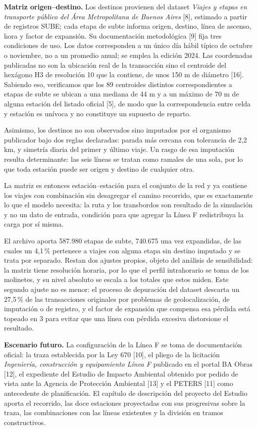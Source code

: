\documentclass{article}
\begin{document}
\textbf{Matriz origen--destino.} Los destinos provienen del dataset \textit{Viajes y etapas en transporte
público del Área Metropolitana de Buenos Aires} [8], estimado a partir de registros SUBE; cada etapa de
subte informa origen, destino, línea de ascenso, hora y factor de expansión. Su documentación metodológica
[9] fija tres condiciones de uso. Los datos corresponden a un único día hábil típico de octubre o noviembre,
no a un promedio anual; se emplea la edición 2024. Las coordenadas publicadas no son la ubicación real de la
transacción sino el centroide del hexágono H3 de resolución 10 que la contiene, de unos 150 m de diámetro [16]. Sabiendo eso, verificamos que los 89 centroides distintos correspondientes a etapas de subte se ubican a una mediana de
44 m y a un máximo de 70 m de alguna estación del listado oficial [5], de modo que la correspondencia entre
celda y estación es unívoca y no constituye un supuesto de reparto. 

Asimismo, los destinos no son observados sino
imputados por el organismo publicador bajo dos reglas declaradas: parada más cercana con tolerancia de
2,2 km, y simetría diaria del primer y último viaje. Un rasgo de esa imputación resulta determinante: las seis líneas se tratan como ramales de una sola, por lo
que toda estación puede ser origen y destino de cualquier otra. 

La matriz es entonces estación--estación para el
conjunto de la red y ya contiene los viajes con combinación sin desagregar el camino recorrido, que es
exactamente lo que el modelo necesita: la ruta y los transbordos son resultado de la simulación y no un dato
de entrada, condición para que agregar la Línea F redistribuya la carga por sí misma. 

El archivo aporta
587.980 etapas de subte, 740.675 una vez expandidas, de las cuales un 4,1\,\% pertenece a viajes con alguna
etapa sin destino imputado y se trata por separado. Restan dos ajustes propios, objeto del análisis de
sensibilidad: la matriz tiene resolución horaria, por lo que el perfil intrahorario se toma de los
molinetes, y su nivel absoluto se escala a los totales que estos miden. Este segundo ajuste no es menor: el
proceso de depuración del dataset descarta un 27,5\,\% de las transacciones originales por problemas de
geolocalización, de imputación o de registro, y el factor de expansión que compensa esa pérdida está topeado
en 3 para evitar que una línea con pérdida excesiva distorsione el resultado.

\textbf{Escenario futuro.} La configuración de la Línea F se toma de documentación oficial: la traza
establecida por la Ley 670 [10], el pliego de la licitación \textit{Ingeniería, construcción y equipamiento
Línea F} publicado en el portal BA Obras [12], el expediente del Estudio de Impacto Ambiental obtenido por
pedido de vista ante la Agencia de Protección Ambiental [13] y el PETERS [11] como antecedente de
planificación. El capítulo de descripción del proyecto del Estudio aporta el recorrido, las doce estaciones
proyectadas con sus progresivas sobre la traza, las combinaciones con las líneas existentes y la división en
tramos constructivos.
\end{document}
